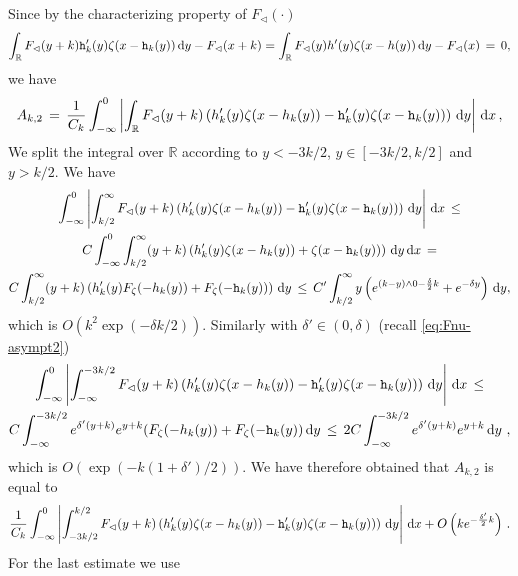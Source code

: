 \documentclass[reqno,11pt]{amsart}
\numberwithin{equation}{section}
\newcommand{\dd}{\,\text{\rm d}}             %
\newcommand{\bbR}{{\ensuremath{\mathbb R}} }
\newcommand{\gd}{\delta}
\newcommand{\gz}{\zeta}
\newcommand{\lar}{\vartriangleleft}
\begin{document}
 Since by the characterizing property of $F_\lar(\cdot)$
 \begin{equation}
 \label{eq:passo-interm1}
 \int_ \bbR F_\lar(y+k) \mathtt{h}'_k(y) \gz( x-\mathtt{h}_k(y)) \dd y - F_\lar(x+k)=
  \int_ \bbR F_\lar(y)h'(y) \gz( x-h(y)) \dd y - F_\lar(x)\, =\,0 ,
 \end{equation}
 we have 
 \begin{equation}
 A_{k,2}\, =\, \frac 1{C_k} \int_{-\infty}^0  \left\vert 
   \int_ \bbR F_\lar(y+k) \left(
   h'_k(y) \gz( x-h_k(y))-   \mathtt{h}'_k(y) \gz( x-\mathtt{h}_k(y)) 
\right)    \dd y  \right\vert \dd x\, ,
 \end{equation}
 We split the integral over $\bbR$ according to $ y < -3k/2$, $y\in[-3k/2, k/2]$ and $y>k/2$. We have 
 \begin{multline}
  \int_{-\infty}^0 \left \vert
  \int_{k/2}^\infty F_\lar(y+k) \left(
   h'_k(y) \gz( x-h_k(y))-   \mathtt{h}'_k(y) \gz( x-\mathtt{h}_k(y)) 
\right)    \dd y  \right\vert \dd x
\, \le \\
C
 \int_{-\infty}^0 
  \int_{k/2}^\infty (y+k) \left(
   h'_k(y) \gz( x-h_k(y)) +  \gz( x-\mathtt{h}_k(y)) 
\right)    \dd y  \dd x\, =
\\
C
  \int_{k/2}^\infty (y+k) \left(
   h'_k(y) F_\gz( -h_k(y)) +  F_\gz( -\mathtt{h}_k(y)) 
\right)    \dd y  \, \le \, 
C'
  \int_{k/2}^\infty y \left(
   e^{(k-y)\wedge 0 -\frac\gd 2 k}  +  e^{-\gd y}
\right)    \dd y ,
 \end{multline}
 which is $O(k^2 \exp(-\gd k/2))$. Similarly with $\gd'\in (0, \gd)$ (recall \eqref{eq:Fnu-asympt2})
 \begin{multline}
  \int_{-\infty}^0 \left \vert
  \int_{-\infty}^{-3k/2} F_\lar(y+k) \left(
   h'_k(y) \gz( x-h_k(y))-   \mathtt{h}'_k(y) \gz( x-\mathtt{h}_k(y)) 
\right)    \dd y  \right\vert \dd x
\, \le \\
C  \int_{-\infty}^{-3k/2} e^{\gd' (y+k)}e^{y+k} (F_\gz(-h_k(y))+F_\gz( -\mathtt{h}_k(y))\dd y\, \le \, 
2C  \int_{-\infty}^{-3k/2} e^{\gd' (y+k)}e^{y+k} \dd y\,
 \,,
\end{multline}
which is $O(\exp(-k(1+ \gd')/2))$.
We have therefore obtained that $A_{k,2}$ is equal to 
\begin{equation}
  \frac 1{C_k} \int_{-\infty}^0  \left\vert 
   \int_{-3k/2}^{k/2} F_\lar(y+k) \left(
   h'_k(y) \gz( x-h_k(y))-   \mathtt{h}'_k(y) \gz( x-\mathtt{h}_k(y)) 
\right)    \dd y  \right\vert \dd x  + O\left(k e^{- \frac {\gd'}  2 k}\right)\, .
 \end{equation}
For the last estimate we use 
\end{document}
